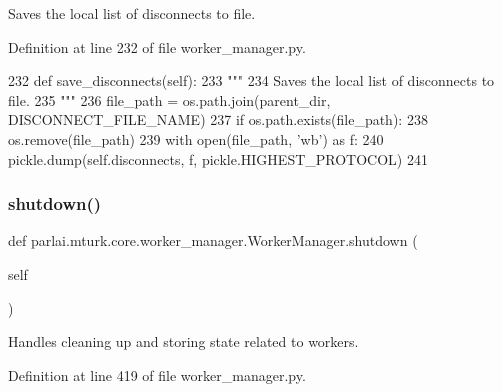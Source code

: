 \begin{DoxyVerb}Saves the local list of disconnects to file.
\end{DoxyVerb}
 

Definition at line 232 of file worker\+\_\+manager.\+py.


\begin{DoxyCode}
232     \textcolor{keyword}{def }save\_disconnects(self):
233         \textcolor{stringliteral}{"""}
234 \textcolor{stringliteral}{        Saves the local list of disconnects to file.}
235 \textcolor{stringliteral}{        """}
236         file\_path = os.path.join(parent\_dir, DISCONNECT\_FILE\_NAME)
237         \textcolor{keywordflow}{if} os.path.exists(file\_path):
238             os.remove(file\_path)
239         with open(file\_path, \textcolor{stringliteral}{'wb'}) \textcolor{keyword}{as} f:
240             pickle.dump(self.disconnects, f, pickle.HIGHEST\_PROTOCOL)
241 
\end{DoxyCode}
\mbox{\label{classparlai_1_1mturk_1_1core_1_1worker__manager_1_1WorkerManager_a814ac330b709eeef4abf4e4a73d71447}} 
\subsubsection{\texorpdfstring{shutdown()}{shutdown()}}
{\footnotesize\ttfamily def parlai.\+mturk.\+core.\+worker\+\_\+manager.\+Worker\+Manager.\+shutdown (\begin{DoxyParamCaption}\item[{}]{self }\end{DoxyParamCaption})}

\begin{DoxyVerb}Handles cleaning up and storing state related to workers.
\end{DoxyVerb}
 

Definition at line 419 of file worker\+\_\+manager.\+py.



